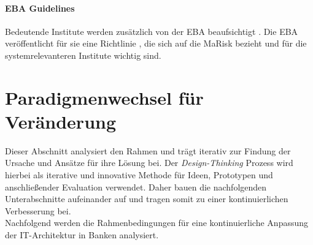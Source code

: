 \paragraph{EBA Guidelines}
Bedeutende Institute werden zusätzlich von der \ac{EBA} beaufsichtigt \cite{recht/Bornemann2018}. Die \ac{EBA} veröffentlicht für sie eine Richtlinie \cite{eba:2019}, die sich auf die \ac{MaRisk} bezieht und für die systemrelevanteren Institute wichtig sind.
%
%
%
%

\section{Paradigmenwechsel für Veränderung}
Dieser Abschnitt analysiert den Rahmen und trägt iterativ zur Findung der Ursache und Ansätze für ihre Lösung bei. Der \emph{Design-Thinking} Prozess wird hierbei als iterative und innovative Methode für Ideen, Prototypen und anschließender Evaluation verwendet. Daher bauen die nachfolgenden Unterabschnitte aufeinander auf und tragen somit zu einer kontinuierlichen Verbesserung bei.
\medskip
\\
Nachfolgend werden die Rahmenbedingungen für eine kontinuierliche Anpassung der IT-Architektur in Banken analysiert.

